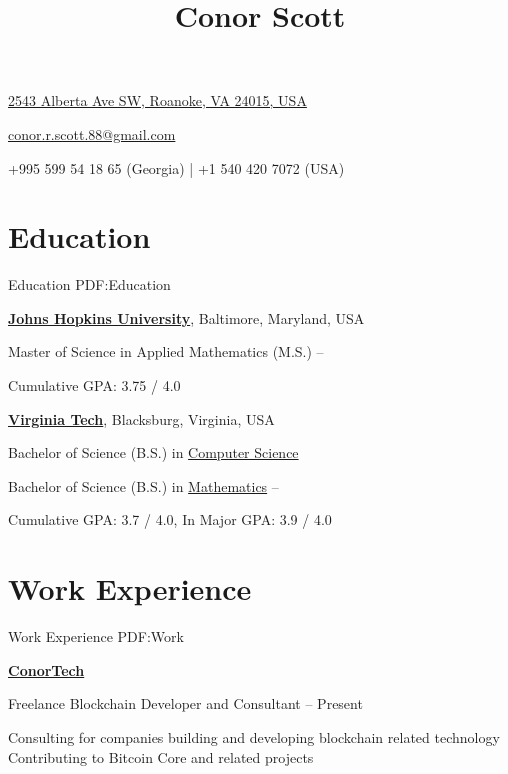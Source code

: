 \documentclass[a4paper,10pt,oneside]{article}
\begin{document}

\title{Conor Scott}

\begin{subtitle}
\href{https://www.google.com/maps/place/2543+Alberta+Ave+SW,+Roanoke,+VA+24015}
{2543 Alberta Ave SW, Roanoke, VA 24015, USA}
\par
\href{mailto:conor.r.scott.88@gmail.com}
{conor.r.scott.88@gmail.com}
\par
+995 599 54 18 65 (Georgia) | +1 540 420 7072 (USA)
\end{subtitle}
\begin{body}


\section
{Education}
{Education}
{PDF:Education}

\href{https://www.jhu.edu/}
{\textbf{Johns Hopkins University}},
Baltimore, Maryland, USA

\SmallEntryGap
Master of Science in Applied Mathematics (M.S.)
\hfill
{} --
\begin{detail}
\BulletItem
Cumulative GPA: 3.75 / 4.0
\end{detail}

\EntryGap
\href{https://www.vt.edu/}
{\textbf{Virginia Tech}},
Blacksburg, Virginia, USA
\par
Bachelor of Science (B.S.) in
\href{https://www.cs.vt.edu/}
{Computer Science}
\par
Bachelor of Science (B.S.) in
\href{https://www.math.vt.edu/}
{Mathematics}
\hfill
{} --
\begin{detail}
\BulletItem
Cumulative GPA: 3.7 / 4.0, In Major GPA: 3.9 / 4.0
\end{detail}

\section
{Work Experience}
{Work Experience}
{PDF:Work}

\href{conscott.github.io}
{\textbf{ConorTech}}
\par
Freelance Blockchain Developer and Consultant
\hfill
{} -- Present
\begin{detail}
\BulletItem Consulting for companies building and developing blockchain related technology
\BulletItem Contributing to Bitcoin Core and related projects
\end{detail}



\end{body}
\end{document}
